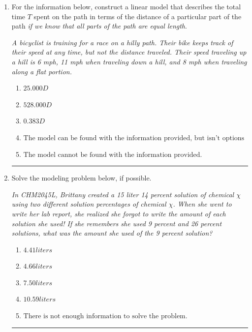 \documentclass[14pt]{extbook}
\newcommand{\litem}[1]{\item#1\hspace*{-1cm}\rule{\textwidth}{0.4pt}}
\begin{document}
\begin{enumerate}
{\begin{enumerate}[label=\Alph*.]
\end{enumerate} }
\litem{
For the information below, construct a linear model that describes the total time $T$ spent on the path in terms of the distance of a particular part of the path \textit{if we know that all parts of the path are equal length}.
\begin{center}
    \textit{ A bicyclist is training for a race on a hilly path. Their bike keeps track of their speed at any time, but not the distance traveled. Their speed traveling up a hill is 6 mph, 11 mph when traveling down a hill, and 8 mph when traveling along a flat portion. }
\end{center}
\begin{enumerate}[label=\Alph*.]
\item \( 25.000 D \)
\item \( 528.000 D \)
\item \( 0.383 D \)
\item \( \text{The model can be found with the information provided, but isn't options 1-3.} \)
\item \( \text{The model cannot be found with the information provided.} \)

\end{enumerate} }
\litem{
Solve the modeling problem below, if possible.
\begin{center}
    \textit{ In CHM2045L, Brittany created a 15 liter 14 percent solution of chemical $\chi$ using two different solution percentages of chemical $\chi$. When she went to write her lab report, she realized she forgot to write the amount of each solution she used! If she remembers she used 9 percent and 26 percent solutions, what was the amount she used of the 9 percent solution? }
\end{center}
\begin{enumerate}[label=\Alph*.]
\item \( 4.41 liters \)
\item \( 4.66 liters \)
\item \( 7.50 liters \)
\item \( 10.59 liters \)
\item \( \text{There is not enough information to solve the problem.} \)


\end{enumerate}}
\end{enumerate}
\end{document}
